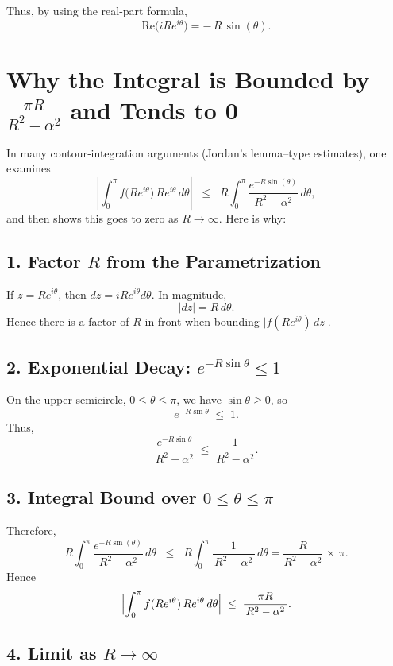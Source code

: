 \documentclass[12pt]{article}
\theoremstyle{definition} %
\theoremstyle{plain} %
\begin{document}
Thus, by using the real-part formula,
\[
\boxed{
\mathrm{Re}\bigl(iR e^{i\theta}\bigr)
= -\,R\,\sin(\theta).
}
\]


\section*{Why the Integral is Bounded by \(\frac{\pi R}{R^2-\alpha^2}\) and Tends to 0}

In many contour‐integration arguments (Jordan's lemma–type estimates), one examines
\[
\left\lvert \int_{0}^{\pi} f\bigl(Re^{i\theta}\bigr)\,Re^{i\theta}\,d\theta \right\rvert 
\;\;\le\;\;
R \int_{0}^{\pi} \frac{e^{-R\sin(\theta)}}{\,R^2 - \alpha^2\,}\,d\theta,
\]
and then shows this goes to zero as \(R \to \infty\).  Here is why:

\subsection*{1. Factor \(R\) from the Parametrization}

If \(z=Re^{i\theta}\), then \(dz = iRe^{i\theta} d\theta\).  In magnitude,
\[
|dz| = R\,d\theta.
\]
Hence there is a factor of \(R\) in front when bounding \(\bigl|f(Re^{i\theta})\,dz\bigr|\).

\subsection*{2. Exponential Decay: \(e^{-R\sin\theta}\le 1\)}

On the upper semicircle, $0 \le \theta \le \pi$, we have $\sin\theta \ge 0$, so
\[
e^{-R\sin\theta} \;\le\; 1.
\]
Thus,
\[
\frac{e^{-R\sin\theta}}{R^2 - \alpha^2} 
\;\le\; \frac{1}{R^2 - \alpha^2}.
\]

\subsection*{3. Integral Bound over $0 \le \theta \le \pi$}

Therefore,
\[
R \int_{0}^{\pi} \frac{e^{-R\sin(\theta)}}{\,R^2 - \alpha^2\,}\,d\theta
\;\;\le\;\;
R \int_{0}^{\pi} \frac{1}{\,R^2 - \alpha^2\,}\,d\theta
= \frac{R}{R^2 - \alpha^2} \,\times\, \pi.
\]
Hence
\[
\Bigl\lvert \int_{0}^{\pi} f(Re^{i\theta})\,Re^{i\theta}\,d\theta \Bigr\rvert
\;\le\;
\frac{\pi R}{\,R^2 - \alpha^2\,}.
\]

\subsection*{4. Limit as $R \to \infty$}
\end{document}
